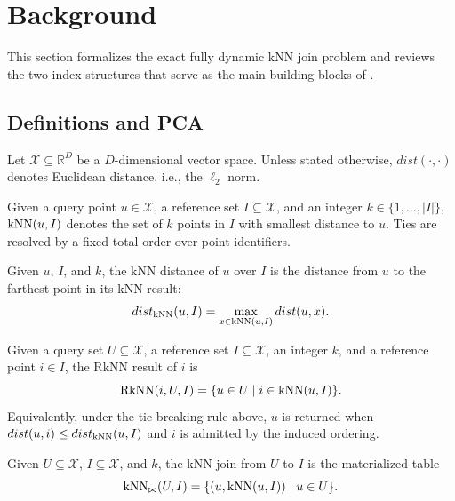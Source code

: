 \section{Background}\label{background}

This section formalizes the exact fully dynamic kNN join problem and reviews the two index structures that serve as the main building blocks of \dualtree.

\subsection{Definitions and PCA}\label{sec:background-preliminaries}

Let $\mathcal{X}\subseteq\mathbb{R}^D$ be a $D$-dimensional vector space. Unless stated otherwise, $dist(\cdot,\cdot)$ denotes Euclidean distance, i.e., the $\ell_2$ norm.

\begin{definition}\label{def:knns}
Given a query point $u\in\mathcal{X}$, a reference set $I\subseteq\mathcal{X}$, and an integer $k\in\{1,\ldots,|I|\}$, $\operatorname{kNN}(u,I)$ denotes the set of $k$ points in $I$ with smallest distance to $u$. Ties are resolved by a fixed total order over point identifiers.
\end{definition}

\begin{definition}\label{def:dknn}
Given $u$, $I$, and $k$, the kNN distance of $u$ over $I$ is the distance from $u$ to the farthest point in its kNN result:
\[
dist_{\operatorname{kNN}}(u,I)=\max_{x\in \operatorname{kNN}(u,I)} dist(u,x).
\]
\end{definition}

\begin{definition}\label{def:rknn}
Given a query set $U\subseteq\mathcal{X}$, a reference set $I\subseteq\mathcal{X}$, an integer $k$, and a reference point $i\in I$, the RkNN result of $i$ is
\[
\operatorname{RkNN}(i,U,I)=\{u\in U \mid i\in \operatorname{kNN}(u,I)\}.
\]
Equivalently, under the tie-breaking rule above, $u$ is returned when $dist(u,i)\le dist_{\operatorname{kNN}}(u,I)$ and $i$ is admitted by the induced ordering.
\end{definition}

\begin{definition}\label{def:knnj}
Given $U\subseteq\mathcal{X}$, $I\subseteq\mathcal{X}$, and $k$, the kNN join from $U$ to $I$ is the materialized table
\begin{equation}
  \operatorname{kNN}_{\bowtie}(U,I)=
  \{(u,\operatorname{kNN}(u,I))\mid u\in U\}.
\end{equation}
\end{definition}

